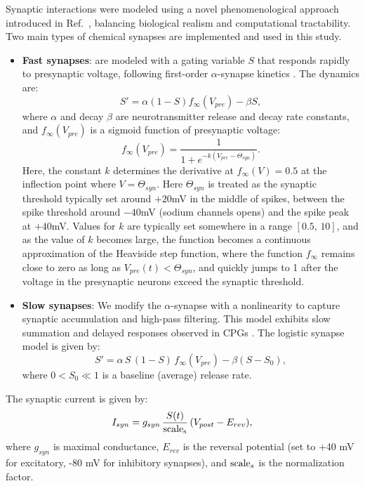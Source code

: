 \documentclass[nofootinbib,aip,amsmath,amssymb,preprint,twocolumn,floatfix,10pt]{revtex4-2}
\begin{document}
Synaptic interactions were modeled using a novel phenomenological approach introduced in  Ref.~\cite{scully2024pairing}, balancing biological realism and computational tractability. Two main types of chemical synapses are implemented and used in this study. 
\begin{itemize}
  \item \textbf{Fast synapses}: are modeled with a gating variable $S$ that responds rapidly to presynaptic voltage, following first-order $\alpha$-synapse kinetics \cite{destexhe1994synthesis, Wang-Rinzel-92, Rall67}. The dynamics are:
  \begin{equation}
    S' = \alpha (1-S) f_{\infty}(V_{pre}) - \beta S,
  \end{equation}
  where  $\alpha$ and decay $\beta$ are neurotransmitter release and decay rate constants, and $f_{\infty}(V_{pre})$ is a sigmoid function of presynaptic voltage:
\begin{equation}
f_{\infty}(V_{pre}) = \frac{1}{1+e^{-k(V_{pre}-\Theta_{syn})}}.  \label{finf}
\end{equation}
Here, the constant $k$ determines the derivative at $f_{\infty}(V) = 0.5$ at the inflection point where $V=\Theta_{syn}$. Here $\Theta_{syn}$ is treated as the synaptic threshold typically set around $+20$mV in the middle of spikes, between the spike threshold around $-40$mV (sodium channels opens) and the spike peak at $+40$mV. Values for $k$ are typically set somewhere in a range $\left[0.5,\, 10\right]$, and as the value of $k$ becomes large,  the function becomes a continuous approximation of the Heaviside step function, where the function $f_\infty$ remains close to zero as long as $V_{pre}(t) < \Theta_{syn}$, and quickly jumps to 1 after the voltage in the presynaptic neurons exceed the synaptic threshold.
  
  \item \textbf{Slow synapses}: We modify the $\alpha$-synapse with a nonlinearity to capture synaptic accumulation and high-pass filtering. This model exhibits slow summation and delayed responses observed in CPGs \cite{NW02, WNT02, TW05, SNLK11}. The logistic synapse model is given by:
  \begin{equation}
    S' = \alpha\, S\,(1-S)\, f_{\infty}(V_{pre}) - \beta (S-S_0),
  \end{equation}
  where $0<S_0 \ll 1$ is a baseline (average) release rate.
\end{itemize}

The synaptic current is given by:
\begin{equation}
  I_{syn} = g_{syn}\, \frac{S(t)}{\rm scale_s}\, (V_{post}-E_{rev}),
\end{equation}
where $g_{syn}$ is maximal conductance, $E_{rev}$ is the reversal potential (set to +40 mV for excitatory, -80 mV for inhibitory synapses), and ${\rm scale}_s$ is the normalization factor.
\end{document}
